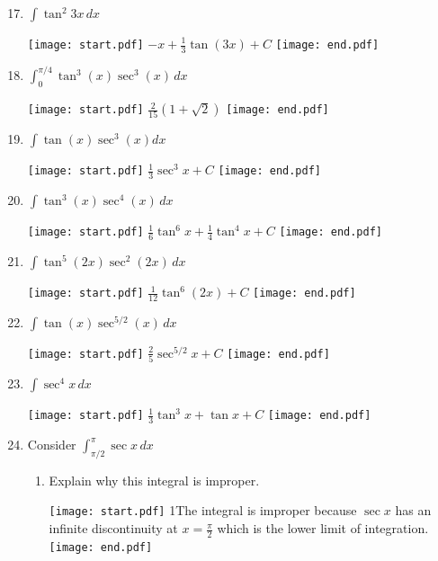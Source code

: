 \documentclass[12pt]{article}
\begin{document}

\begin{enumerate}
\setcounter{enumi}{16}

\item $\int \tan^2{3x}\,dx$ 

\texttt{[image: start.pdf]}
{{$-x+\frac{1}{3}\tan{(3x)}+C$}}
\texttt{[image: end.pdf]}


\item $\int_0^{\pi/4} \tan^{3}{(x)}\sec^3{(x)}\,dx$  

\texttt{[image: start.pdf]}
{{$\frac{2}{15}\left(1+\sqrt{2}\right)$}}
\texttt{[image: end.pdf]}


\item $\int \tan{(x)}\sec^3{(x)}dx$ 

\texttt{[image: start.pdf]}
{{$\frac{1}{3}\sec^3{x}+C$}}
\texttt{[image: end.pdf]}


\item $\int \tan^3{(x)}\sec^4{(x)\,}dx$ 

\texttt{[image: start.pdf]}
{{$\frac{1}{6}\tan^6{x}+\frac{1}{4}\tan^{4}{x}+C$}}
\texttt{[image: end.pdf]}


\item $\int \tan^5{(2x)}\sec^2{(2x)}\,dx$ 

\texttt{[image: start.pdf]}
{{$\frac{1}{12}\tan^6{(2x)}+C$}}
\texttt{[image: end.pdf]}


\item $\int \tan{(x)}\sec^{5/2}{(x)}\,dx$ 

\texttt{[image: start.pdf]}
{{$\frac{2}{5}\sec^{5/2}{x}+C$}}
\texttt{[image: end.pdf]}


\item $\int \sec^{4}{x}\,dx$ 

\texttt{[image: start.pdf]}
{{$\frac{1}{3}\tan^3{x}+\tan{x}+C$}}
\texttt{[image: end.pdf]}


\item Consider $\int_{\pi/2}^\pi \sec{x} \,dx$

\begin{enumerate}

\item Explain why this integral is improper.

\texttt{[image: start.pdf]}
{{{1\linewidth}{The integral is improper because $\sec{x}$ has an infinite discontinuity at $x=\frac{\pi}{2}$ which is the lower limit of integration.}}}
\texttt{[image: end.pdf]}



\end{enumerate}
\end{enumerate}
\end{document}
